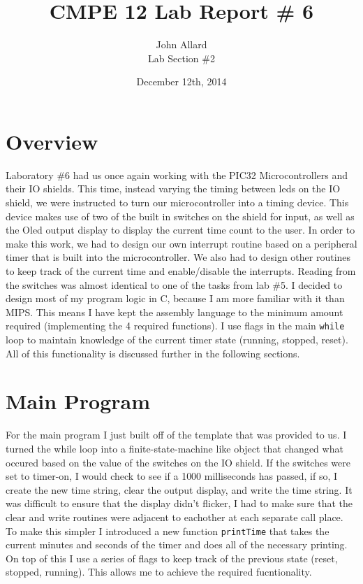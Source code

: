 \documentclass[a4paper,11pt]{article}
\title{ CMPE 12 Lab Report \# 6 \\[7 in]}
\author{John Allard \\  Lab Section \#2}
\date{December 12th, 2014}
\begin{document}
\maketitle
 

\section{Overview}
Laboratory \#6 had us once again working with the PIC32 Microcontrollers and their IO shields. This time, instead varying the timing between leds on the IO shield, we were instructed to turn our microcontroller into a timing device. This device makes use of two of the built in switches on the shield for input, as well as the Oled output display to display the current time count to the user. In order to make this work, we had to design our own interrupt routine based on a peripheral timer that is built into the microcontroller. We also had to design other routines to keep track of the current time and enable/disable the interrupts. Reading from the switches was almost identical to one of the tasks from lab \#5. I decided to design most of my program logic in C, because I am more familiar with it than MIPS. This means I have kept the assembly language to the minimum amount required (implementing the 4 required functions). I use flags in the main \texttt{while} loop to maintain knowledge of the current timer state (running, stopped, reset). All of this functionality is discussed further in the following sections.

\section{Main Program}
For the main program I just built off of the template that was provided to us. I turned the while loop into a finite-state-machine like object that changed what occured based on the value of the switches on the IO shield. If the switches were set to timer-on, I would check to see if a 1000 milliseconds has passed, if so, I create the new time string, clear the output display, and write the time string. It was difficult to ensure that the display didn't flicker, I had to make sure that the clear and write routines were adjacent to eachother at each separate call place. To make this simpler I introduced a new function \texttt{printTime} that takes the current minutes and seconds of the timer and does all of the necessary printing. On top of this I use a series of flags to keep track of the previous state (reset, stopped, running). This allows me to achieve the required fucntionality.
\end{document}
